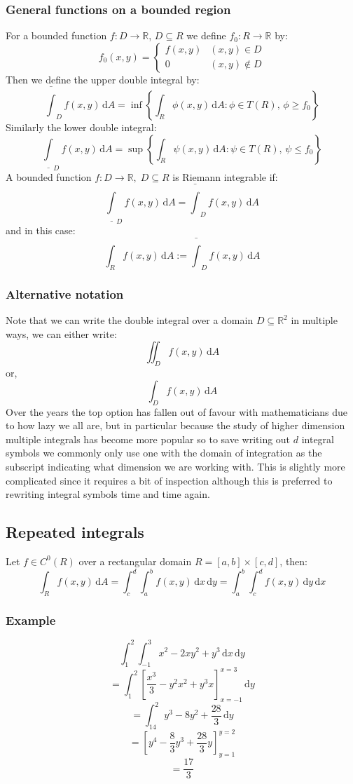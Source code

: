 \documentclass[12pt]{article}
\begin{document}
\subsubsection*{General functions on a bounded region}
For a bounded function \(f:D\to \mathbb{R}\), \(D\subseteq R\) we define \(f_0:R\to\mathbb{R}\) by:
\[f_0(x,y)=\begin{cases}
    f(x,y) & (x,y)\in D \\
    0 & (x,y)\notin D
\end{cases}\]
Then we define the upper double integral by:
\[\bar{\int}_Df(x,y)\,\text{d}A=\inf\left\{\int_R\phi(x,y)\,\text{d}A:\phi\in T(R),\, \phi\geq f_0\right\}\]
Similarly the lower double integral:
\[\underline{\int}_Df(x,y)\,\text{d}A=\sup\left\{\int_R\psi(x,y)\,\text{d}A:\psi\in T(R),\, \psi\leq f_0\right\}\]
A bounded function \(f:D\to \mathbb{R},\;D\subseteq R\) is Riemann integrable if:
\[\underline{\int}_Df(x,y)\,\text{d}A=\bar{\int}_Df(x,y)\,\text{d}A\]
and in this case:
\[\int_Rf(x,y)\,\text{d}A:=\bar{\int}_Df(x,y)\,\text{d}A\]
\subsubsection*{Alternative notation}
Note that we can write the double integral over a domain \(D\subseteq\mathbb{R}^2\) in multiple ways, we can either write:
\[\iint_Df(x,y)\,\text{d}A\]
or,
\[\int_Df(x,y)\,\text{d}A\]
Over the years the top option has fallen out of favour with mathematicians due to how lazy we all are, but in particular because the study of higher dimension multiple integrals has become more popular so to save writing out \(d\) integral symbols we commonly only use one with the domain of integration as the subscript indicating what dimension we are working with. This is slightly more complicated since it requires a bit of inspection although this is preferred to rewriting integral symbols time and time again.
\subsection*{Repeated integrals}
Let \(f\in C^0(R)\) over a rectangular domain \(R=[a,b]\times[c,d]\), then:
\[\int_Rf(x,y)\,\text{d}A=\int^d_c\int^b_af(x,y)\,\text{d}x\,\text{d}y=\int^b_a\int^d_cf(x,y)\,\text{d}y\,\text{d}x\]
\subsubsection*{Example}
\[\int^2_1\int^3_{-1}x^2-2xy^2+y^3\,\text{d}x\,\text{d}y\]
\[=\int^2_1\left[\frac{x^3}{3}-y^2x^2+y^3x\right]^{x=3}_{x=-1}\,\text{d}y\]
\[=\int^2_14y^3-8y^2+\frac{28}{3}\,\text{d}y\]
\[=\left[y^4-\frac{8}{3}y^3+\frac{28}{3}y\right]^{y=2}_{y=1}\]
\[=\frac{17}{3}\]
\end{document}
